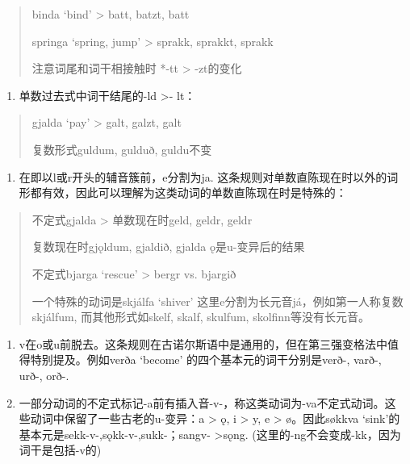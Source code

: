 \begin{quote}
binda `bind‌' \textgreater{} batt, batzt, batt

springa `spring, jump‌' \textgreater{} sprakk, sprakkt, sprakk

注意词尾和词干相接触时 *-tt \textgreater{} -zt的变化
\end{quote}

\begin{enumerate}
\def\labelenumi{\arabic{enumi})}
\setcounter{enumi}{1}
\item
  单数过去式中词干结尾的-ld \textgreater- lt：
\end{enumerate}

\begin{quote}
gjalda `pay‌' \textgreater{} galt, galzt, galt

复数形式guldum, gulduð, guldu不变
\end{quote}

\begin{enumerate}
\def\labelenumi{\arabic{enumi})}
\setcounter{enumi}{2}
\item
  在即以l或r开头的辅音簇前，e分割为ja.
  这条规则对单数直陈现在时以外的词形都有效，因此可以理解为这类动词的单数直陈现在时是特殊的：
\end{enumerate}

\begin{quote}
不定式gjalda \textgreater{} 单数现在时geld, geldr, geldr

复数现在时gjǫldum, gjaldið, gjalda ǫ是u-变异后的结果

不定式bjarga `rescue‌' \textgreater{} bergr vs. bjargið

一个特殊的动词是skjálfa `shiver‌'
这里e分割为长元音já，例如第一人称复数skjálfum, 而其他形式如skelf, skalf,
skulfum, skolfinn等没有长元音。
\end{quote}

\begin{enumerate}
\def\labelenumi{\arabic{enumi})}
\setcounter{enumi}{3}
\item
  v在o或u前脱去。这条规则在古诺尔斯语中是通用的，但在第三强变格法中值得特别提及。例如verða
  `become‌' 的四个基本元的词干分别是verð-, varð-, urð-, orð-.
\item
  一部分动词的不定式标记-a前有插入音-v-，称这类动词为-va不定式动词。这些动词中保留了一些古老的u-变异：a
  \textgreater{} ǫ, i \textgreater{} y, e \textgreater{} ø。因此søkkva
  `sink‌'的基本元是sekk-v-,sǫkk-v-,sukk-；sangv- \textgreater sǫng.
  (这里的-ng不会变成-kk，因为词干是包括-v的)
\end{enumerate}

